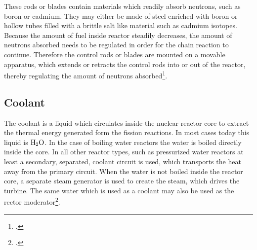 These rods or blades contain materials which readily absorb neutrons, such as boron or cadmium. %
They may either be made of steel enriched with boron or hollow tubes filled with a brittle salt like material such as cadmium isotopes.
Because the amount of fuel inside reactor steadily decreases, the amount of neutrons absorbed needs to
be regulated in order for the chain reaction to continue. Therefore the control rods or blades are
mounted on a movable apparatus, which extends or retracts the control rods into or out of the reactor,
thereby regulating the amount of neutrons absorbed\footcite{grayson}.

\subsection{Coolant}
The coolant is a liquid which circulates inside the nuclear reactor core to extract the thermal energy
generated form the fission reactions. In most cases today this liquid is $\ce{H_{2}O}$. In the case
of boiling water reactors the water is boiled directly inside the core. In all other reactor types,
such as pressurized water reactors at least a secondary, separated, coolant circuit is used, which
transports the heat away from the primary circuit. When the water is not boiled inside the reactor
core, a separate steam generator is used to create the steam, which drives the turbine. The same
water which is used as a coolant may also be used as the rector moderator\footcite{WNPR}.
